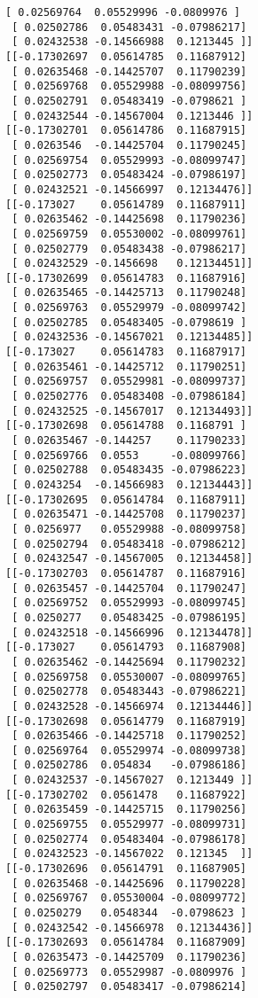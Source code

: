 \documentclass[11pt]{article}
\begin{document}
\begin{Verbatim}[commandchars=\\\{\}]
 [ 0.02569764  0.05529996 -0.0809976 ]
 [ 0.02502786  0.05483431 -0.07986217]
 [ 0.02432538 -0.14566988  0.1213445 ]]
[[-0.17302697  0.05614785  0.11687912]
 [ 0.02635468 -0.14425707  0.11790239]
 [ 0.02569768  0.05529988 -0.08099756]
 [ 0.02502791  0.05483419 -0.0798621 ]
 [ 0.02432544 -0.14567004  0.1213446 ]]
[[-0.17302701  0.05614786  0.11687915]
 [ 0.0263546  -0.14425704  0.11790245]
 [ 0.02569754  0.05529993 -0.08099747]
 [ 0.02502773  0.05483424 -0.07986197]
 [ 0.02432521 -0.14566997  0.12134476]]
[[-0.173027    0.05614789  0.11687911]
 [ 0.02635462 -0.14425698  0.11790236]
 [ 0.02569759  0.05530002 -0.08099761]
 [ 0.02502779  0.05483438 -0.07986217]
 [ 0.02432529 -0.1456698   0.12134451]]
[[-0.17302699  0.05614783  0.11687916]
 [ 0.02635465 -0.14425713  0.11790248]
 [ 0.02569763  0.05529979 -0.08099742]
 [ 0.02502785  0.05483405 -0.0798619 ]
 [ 0.02432536 -0.14567021  0.12134485]]
[[-0.173027    0.05614783  0.11687917]
 [ 0.02635461 -0.14425712  0.11790251]
 [ 0.02569757  0.05529981 -0.08099737]
 [ 0.02502776  0.05483408 -0.07986184]
 [ 0.02432525 -0.14567017  0.12134493]]
[[-0.17302698  0.05614788  0.1168791 ]
 [ 0.02635467 -0.144257    0.11790233]
 [ 0.02569766  0.0553     -0.08099766]
 [ 0.02502788  0.05483435 -0.07986223]
 [ 0.0243254  -0.14566983  0.12134443]]
[[-0.17302695  0.05614784  0.11687911]
 [ 0.02635471 -0.14425708  0.11790237]
 [ 0.0256977   0.05529988 -0.08099758]
 [ 0.02502794  0.05483418 -0.07986212]
 [ 0.02432547 -0.14567005  0.12134458]]
[[-0.17302703  0.05614787  0.11687916]
 [ 0.02635457 -0.14425704  0.11790247]
 [ 0.02569752  0.05529993 -0.08099745]
 [ 0.0250277   0.05483425 -0.07986195]
 [ 0.02432518 -0.14566996  0.12134478]]
[[-0.173027    0.05614793  0.11687908]
 [ 0.02635462 -0.14425694  0.11790232]
 [ 0.02569758  0.05530007 -0.08099765]
 [ 0.02502778  0.05483443 -0.07986221]
 [ 0.02432528 -0.14566974  0.12134446]]
[[-0.17302698  0.05614779  0.11687919]
 [ 0.02635466 -0.14425718  0.11790252]
 [ 0.02569764  0.05529974 -0.08099738]
 [ 0.02502786  0.054834   -0.07986186]
 [ 0.02432537 -0.14567027  0.1213449 ]]
[[-0.17302702  0.0561478   0.11687922]
 [ 0.02635459 -0.14425715  0.11790256]
 [ 0.02569755  0.05529977 -0.08099731]
 [ 0.02502774  0.05483404 -0.07986178]
 [ 0.02432523 -0.14567022  0.121345  ]]
[[-0.17302696  0.05614791  0.11687905]
 [ 0.02635468 -0.14425696  0.11790228]
 [ 0.02569767  0.05530004 -0.08099772]
 [ 0.0250279   0.0548344  -0.0798623 ]
 [ 0.02432542 -0.14566978  0.12134436]]
[[-0.17302693  0.05614784  0.11687909]
 [ 0.02635473 -0.14425709  0.11790236]
 [ 0.02569773  0.05529987 -0.0809976 ]
 [ 0.02502797  0.05483417 -0.07986214]

\end{Verbatim}
\end{document}
